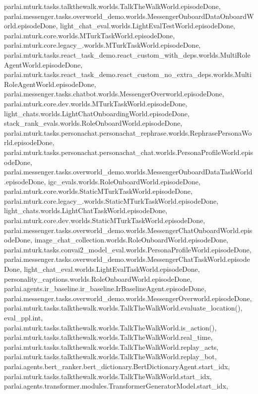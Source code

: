 parlai.\+mturk.\+tasks.\+talkthewalk.\+worlds.\+Talk\+The\+Walk\+World.\+episode\+Done, parlai.\+messenger.\+tasks.\+overworld\+\_\+demo.\+worlds.\+Messenger\+Onboard\+Data\+Onboard\+World.\+episode\+Done, light\+\_\+chat\+\_\+eval.\+worlds.\+Light\+Eval\+Test\+World.\+episode\+Done, parlai.\+mturk.\+core.\+worlds.\+M\+Turk\+Task\+World.\+episode\+Done, parlai.\+mturk.\+core.\+legacy\+\_.\+worlds.\+M\+Turk\+Task\+World.\+episode\+Done, parlai.\+mturk.\+tasks.\+react\+\_\+task\+\_\+demo.\+react\+\_\+custom\+\_\+with\+\_\+deps.\+worlds.\+Multi\+Role\+Agent\+World.\+episode\+Done, parlai.\+mturk.\+tasks.\+react\+\_\+task\+\_\+demo.\+react\+\_\+custom\+\_\+no\+\_\+extra\+\_\+deps.\+worlds.\+Multi\+Role\+Agent\+World.\+episode\+Done, parlai.\+messenger.\+tasks.\+chatbot.\+worlds.\+Messenger\+Overworld.\+episode\+Done, parlai.\+mturk.\+core.\+dev.\+worlds.\+M\+Turk\+Task\+World.\+episode\+Done, light\+\_\+chats.\+worlds.\+Light\+Chat\+Onboarding\+World.\+episode\+Done, stack\+\_\+rank\+\_\+evals.\+worlds.\+Role\+Onboard\+World.\+episode\+Done, parlai.\+mturk.\+tasks.\+personachat.\+personachat\+\_\+rephrase.\+worlds.\+Rephrase\+Persona\+World.\+episode\+Done, parlai.\+mturk.\+tasks.\+personachat.\+personachat\+\_\+chat.\+worlds.\+Persona\+Profile\+World.\+episode\+Done, parlai.\+messenger.\+tasks.\+overworld\+\_\+demo.\+worlds.\+Messenger\+Onboard\+Data\+Task\+World.\+episode\+Done, igc\+\_\+evals.\+worlds.\+Role\+Onboard\+World.\+episode\+Done, parlai.\+mturk.\+core.\+worlds.\+Static\+M\+Turk\+Task\+World.\+episode\+Done, parlai.\+mturk.\+core.\+legacy\+\_.\+worlds.\+Static\+M\+Turk\+Task\+World.\+episode\+Done, light\+\_\+chats.\+worlds.\+Light\+Chat\+Task\+World.\+episode\+Done, parlai.\+mturk.\+core.\+dev.\+worlds.\+Static\+M\+Turk\+Task\+World.\+episode\+Done, parlai.\+messenger.\+tasks.\+overworld\+\_\+demo.\+worlds.\+Messenger\+Chat\+Onboard\+World.\+episode\+Done, image\+\_\+chat\+\_\+collection.\+worlds.\+Role\+Onboard\+World.\+episode\+Done, parlai.\+mturk.\+tasks.\+convai2\+\_\+model\+\_\+eval.\+worlds.\+Persona\+Profile\+World.\+episode\+Done, parlai.\+messenger.\+tasks.\+overworld\+\_\+demo.\+worlds.\+Messenger\+Chat\+Task\+World.\+episode\+Done, light\+\_\+chat\+\_\+eval.\+worlds.\+Light\+Eval\+Task\+World.\+episode\+Done, personality\+\_\+captions.\+worlds.\+Role\+Onboard\+World.\+episode\+Done, parlai.\+agents.\+ir\+\_\+baseline.\+ir\+\_\+baseline.\+Ir\+Baseline\+Agent.\+episode\+Done, parlai.\+messenger.\+tasks.\+overworld\+\_\+demo.\+worlds.\+Messenger\+Overworld.\+episode\+Done, parlai.\+mturk.\+tasks.\+talkthewalk.\+worlds.\+Talk\+The\+Walk\+World.\+evaluate\+\_\+location(), eval\+\_\+ppl.\+int, parlai.\+mturk.\+tasks.\+talkthewalk.\+worlds.\+Talk\+The\+Walk\+World.\+is\+\_\+action(), parlai.\+mturk.\+tasks.\+talkthewalk.\+worlds.\+Talk\+The\+Walk\+World.\+real\+\_\+time, parlai.\+mturk.\+tasks.\+talkthewalk.\+worlds.\+Talk\+The\+Walk\+World.\+replay\+\_\+acts, parlai.\+mturk.\+tasks.\+talkthewalk.\+worlds.\+Talk\+The\+Walk\+World.\+replay\+\_\+bot, parlai.\+agents.\+bert\+\_\+ranker.\+bert\+\_\+dictionary.\+Bert\+Dictionary\+Agent.\+start\+\_\+idx, parlai.\+mturk.\+tasks.\+talkthewalk.\+worlds.\+Talk\+The\+Walk\+World.\+start\+\_\+idx, parlai.\+agents.\+transformer.\+modules.\+Transformer\+Generator\+Model.\+start\+\_\+idx, 